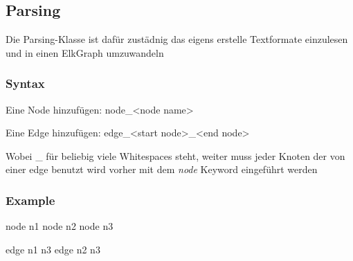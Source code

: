 


\subsection*{Parsing}
Die Parsing-Klasse ist dafür zustädnig das eigens erstelle Textformate einzulesen
und in einen ElkGraph umzuwandeln

\subsubsection*{Syntax}
Eine Node hinzufügen:
  node_<node name>
  
Eine Edge hinzufügen:
  edge_<start node>_<end node>
 
Wobei _ für beliebig viele Whitespaces steht,
weiter muss jeder Knoten der von einer edge benutzt wird vorher mit dem \textit{node} Keyword eingeführt werden

\subsubsection*{Example}
node n1
node n2
node n3


edge n1 n3
edge n2 n3 












